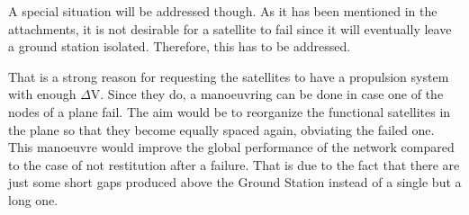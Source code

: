 A special situation will be addressed though. As it has been mentioned in the attachments, it is not desirable for a satellite to fail since it will eventually leave a ground station isolated. Therefore, this has to be addressed. 

That is a strong reason for requesting the satellites to have a propulsion system with enough $\Delta$V. Since they do, a manoeuvring can be done in case one of the nodes of a plane fail. The aim would be to reorganize the functional satellites in the plane so that they become equally spaced again, obviating the failed one. This manoeuvre would improve the global performance of the network compared to the case of not restitution after a failure. That is due to the fact that there are just some short gaps produced above the Ground Station instead of a single but a long one.